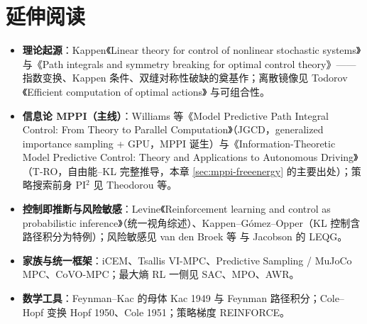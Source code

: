 \section*{延伸阅读}
\begin{itemize}
  \item \textbf{理论起源}：Kappen《Linear theory for control of nonlinear stochastic systems》\cite{kappen2005linear} 与《Path integrals and symmetry breaking for optimal control theory》\cite{kappen2005path}——指数变换、Kappen 条件、双缝对称性破缺的奠基作；离散镜像见 Todorov《Efficient computation of optimal actions》\cite{todorov2009efficient} 与可组合性\cite{todorov2009compositionality}。
  \item \textbf{信息论 MPPI（主线）}：Williams 等《Model Predictive Path Integral Control: From Theory to Parallel Computation》\cite{williams2017model}（JGCD，generalized importance sampling + GPU，MPPI 诞生）与《Information-Theoretic Model Predictive Control: Theory and Applications to Autonomous Driving》\cite{williams2018information}（T-RO，自由能--KL 完整推导，本章 \cref{sec:mppi-freeenergy} 的主要出处）；策略搜索前身 PI$^2$ 见 Theodorou 等\cite{theodorou2010generalized}。
  \item \textbf{控制即推断与风险敏感}：Levine《Reinforcement learning and control as probabilistic inference》\cite{levine2018reinforcement}（统一视角综述）、Kappen--Gómez--Opper\cite{kappen2012optimal}（KL 控制含路径积分为特例）；风险敏感见 van den Broek 等\cite{vandenbroek2010risk} 与 Jacobson 的 LEQG\cite{jacobson1973optimal}。
  \item \textbf{家族与统一框架}：iCEM\cite{pinneri2020sample}、Tsallis VI-MPC\cite{wang2021variational}、Predictive Sampling / MuJoCo MPC\cite{howell2022predictive}、CoVO-MPC\cite{yi2024covo}；最大熵 RL 一侧见 SAC\cite{haarnoja2018soft}、MPO\cite{abdolmaleki2018maximum}、AWR\cite{peng2019advantage}。
  \item \textbf{数学工具}：Feynman--Kac 的母体 Kac 1949\cite{kac1949distributions} 与 Feynman 路径积分\cite{feynman1948spacetime}；Cole--Hopf 变换 Hopf 1950\cite{hopf1950partial}、Cole 1951\cite{cole1951quasi}；策略梯度 REINFORCE\cite{williams1992simple}。
\end{itemize}

